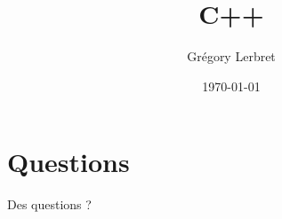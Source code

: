 \documentclass[t, 10pt]{beamer}
\begin{document}
\author{Grégory Lerbret}
\title{C++}
\date{\today}

\frame[plain]{\maketitle}



\section*{Questions}
\begin{frame}[c]
	\begin{center}
		\huge Des questions ?
	\end{center}
\end{frame}


\end{document}
